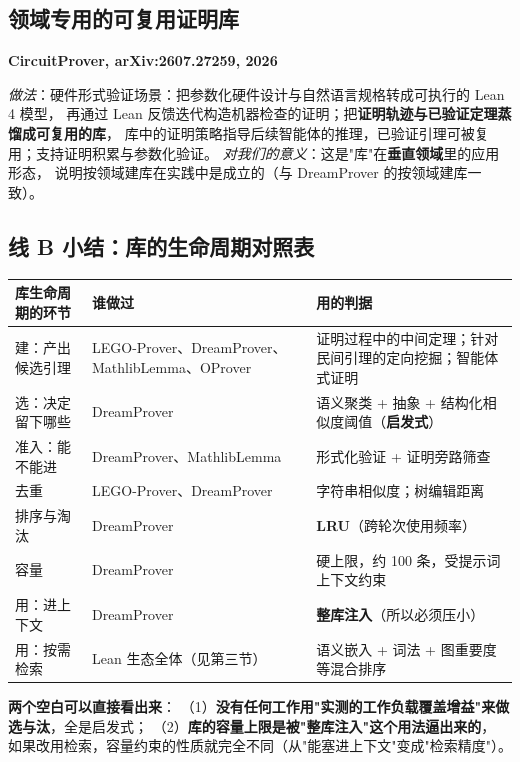 \documentclass[UTF8,a4paper,11pt,fontset=windows]{ctexart}
\newcommand{\paper}[1]{\par\medskip\noindent\textbf{\color{sgblue!80!black}#1}\par\nobreak\vspace{1pt}}
\newcommand{\field}[1]{\textit{#1}：}
\begin{document}
\subsection{领域专用的可复用证明库}

\paper{CircuitProver, arXiv:2607.27259, 2026}
\field{做法}硬件形式验证场景：把参数化硬件设计与自然语言规格转成可执行的 Lean 4 模型，
再通过 Lean 反馈迭代构造机器检查的证明；把\textbf{证明轨迹与已验证定理蒸馏成可复用的库}，
库中的证明策略指导后续智能体的推理，已验证引理可被复用；支持证明积累与参数化验证。
\field{对我们的意义}这是"库"在\textbf{垂直领域}里的应用形态，
说明按领域建库在实践中是成立的（与 DreamProver 的按领域建库一致）。

\subsection{线 B 小结：库的生命周期对照表}

\begin{table}[htbp]
\centering
\footnotesize
\begin{tabularx}{\textwidth}{@{}p{2.6cm}p{4.0cm}Y@{}}
\toprule
\textbf{库生命周期的环节} & \textbf{谁做过} & \textbf{用的判据} \\
\midrule
建：产出候选引理 & LEGO-Prover、DreamProver、MathlibLemma、OProver &
证明过程中的中间定理；针对民间引理的定向挖掘；智能体式证明 \\
\midrule
选：决定留下哪些 & DreamProver & 语义聚类 + 抽象 + 结构化相似度阈值（\textbf{启发式}） \\
\midrule
准入：能不能进 & DreamProver、MathlibLemma & 形式化验证 + 证明旁路筛查 \\
\midrule
去重 & LEGO-Prover、DreamProver & 字符串相似度；树编辑距离 \\
\midrule
排序与淘汰 & DreamProver & \textbf{LRU}（跨轮次使用频率） \\
\midrule
容量 & DreamProver & 硬上限，约 100 条，受提示词上下文约束 \\
\midrule
用：进上下文 & DreamProver & \textbf{整库注入}（所以必须压小） \\
\midrule
用：按需检索 & Lean 生态全体（见第三节） & 语义嵌入 + 词法 + 图重要度等混合排序 \\
\bottomrule
\end{tabularx}
\end{table}

\textbf{两个空白可以直接看出来}：
（1）\textbf{没有任何工作用"实测的工作负载覆盖增益"来做选与汰}，全是启发式；
（2）\textbf{库的容量上限是被"整库注入"这个用法逼出来的}，
如果改用检索，容量约束的性质就完全不同（从"能塞进上下文"变成"检索精度"）。
\end{document}
